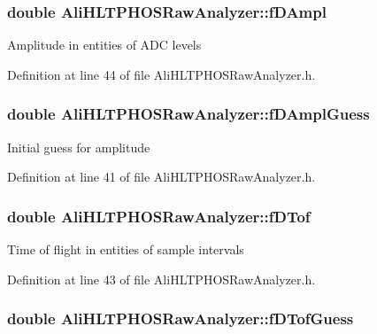 \subsubsection{\setlength{\rightskip}{0pt plus 5cm}double {\bf Ali\-HLTPHOSRaw\-Analyzer::f\-DAmpl}\hspace{0.3cm}{\tt  [protected, inherited]}}\label{classAliHLTPHOSRawAnalyzer_AliHLTPHOSRawAnalyzerPeakFinderp6}


Amplitude in entities of ADC levels 

Definition at line 44 of file Ali\-HLTPHOSRaw\-Analyzer.h.
\subsubsection{\setlength{\rightskip}{0pt plus 5cm}double {\bf Ali\-HLTPHOSRaw\-Analyzer::f\-DAmpl\-Guess}\hspace{0.3cm}{\tt  [protected, inherited]}}\label{classAliHLTPHOSRawAnalyzer_AliHLTPHOSRawAnalyzerPeakFinderp3}


Initial guess for amplitude 

Definition at line 41 of file Ali\-HLTPHOSRaw\-Analyzer.h.
\subsubsection{\setlength{\rightskip}{0pt plus 5cm}double {\bf Ali\-HLTPHOSRaw\-Analyzer::f\-DTof}\hspace{0.3cm}{\tt  [protected, inherited]}}\label{classAliHLTPHOSRawAnalyzer_AliHLTPHOSRawAnalyzerPeakFinderp5}


Time of flight in entities of sample intervals 

Definition at line 43 of file Ali\-HLTPHOSRaw\-Analyzer.h.
\subsubsection{\setlength{\rightskip}{0pt plus 5cm}double {\bf Ali\-HLTPHOSRaw\-Analyzer::f\-DTof\-Guess}\hspace{0.3cm}{\tt  [protected, inherited]}}\label{classAliHLTPHOSRawAnalyzer_AliHLTPHOSRawAnalyzerPeakFinderp2}


